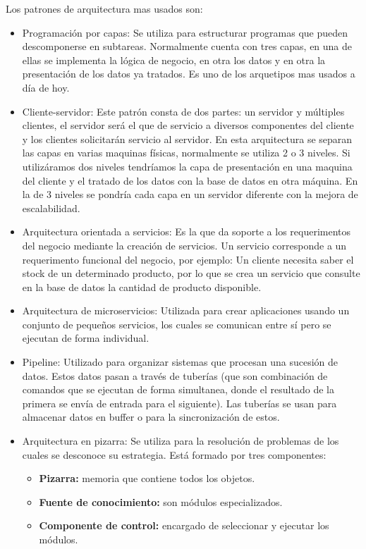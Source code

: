 \documentclass[12pt]{report} %
\begin{document}
 Los patrones de arquitectura mas usados son:
 	\begin{itemize}
 	\item Programación por capas: Se utiliza para estructurar programas que pueden descomponerse en subtareas. Normalmente cuenta con tres capas, en una de ellas se implementa la lógica de negocio, en otra los datos y en otra la presentación de los datos ya tratados. Es uno de los arquetipos mas usados a día de hoy.
 	\item Cliente-servidor: Este patrón consta de dos partes: un servidor y múltiples clientes, el servidor será el que de servicio a diversos componentes del cliente y los clientes solicitarán servicio al servidor. En esta arquitectura se separan las capas en varias maquinas físicas, normalmente se utiliza 2 o 3 niveles. Si utilizáramos dos niveles tendríamos la capa de presentación en una maquina del cliente y el tratado de los datos con la base de datos en otra máquina. En la de 3 niveles se pondría cada capa en un servidor diferente con la mejora de escalabilidad.
 	\item Arquitectura orientada a servicios: Es la que da soporte a los requerimentos del negocio mediante la creación de servicios. Un servicio corresponde a un requerimento funcional del negocio, por ejemplo: 
 	Un cliente necesita saber el stock de un determinado producto, por lo que se crea un servicio que consulte en la base de datos la cantidad de producto disponible.
 	\item Arquitectura de microservicios: Utilizada para crear aplicaciones usando un conjunto de pequeños servicios, los cuales se comunican entre sí pero se ejecutan de forma individual.
 	\item Pipeline: Utilizado para organizar sistemas que procesan una sucesión de datos. Estos datos pasan a través de tuberías (que son combinación de comandos que se ejecutan de forma simultanea, donde el resultado de la primera se envía de entrada para el siguiente). Las tuberías se usan para almacenar datos en buffer o para la sincronización de estos.
 	\item Arquitectura en pizarra: Se utiliza para la resolución de problemas de los cuales se desconoce su estrategia. Está formado por tres componentes:
 	\begin{itemize}
 		\item \textbf{Pizarra:} memoria que contiene todos los objetos. 
 		\item \textbf{Fuente de conocimiento:} son módulos especializados. 
 		\item \textbf{Componente de control:} encargado de seleccionar y ejecutar los módulos.

\end{itemize}
\end{itemize}
\end{document}
